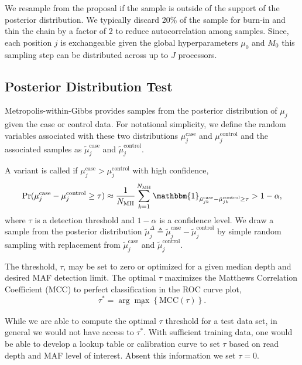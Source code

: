 \documentclass{bioinfo}
\begin{document}
We resample from the proposal if the sample is outside of the support of the posterior distribution. We typically discard 20\% of the sample for burn-in and thin the chain by a factor of 2 to reduce autocorrelation among samples. Since, each position $j$ is exchangeable given the global hyperparameters $\mu_0$ and $M_0$ this sampling step can be distributed across up to $J$ processors.

\subsection{Posterior Distribution Test}\label{sec:hypothesis_test}
Metropolis-within-Gibbs provides samples from the posterior distribution of $\mu_j$ given the case or control data. For notational simplicity, we define the random variables associated with these two distributions $\mu_j^{\text{case}}$ and $\mu_j^{\text{control}}$ and the associated samples as $\tilde{\mu}_j^{\text{case}}$ and $\tilde{\mu}_j^{\text{control}}$.

A variant is called if $\mu_j^{\text{case}} > \mu_j^{\text{control}}$ with high confidence,
\begin{equation}\label{eqn:bayes_test}
	\Pr( \mu_j^{\text{case}} - \mu_j^{\text{control}}  \geq \tau ) \approx \frac{1}{N_{\text{MH}}} \sum_{k=1}^{N_{\text{MH}}} \mathbbm{1}_{\tilde{\mu}_{jk}^{\text{case}} - \tilde{\mu}_{jk}^{\text{control}} \geq \tau } > 1-\alpha,
\end{equation}
where $\tau$ is a detection threshold and $1-\alpha$ is a confidence level. We draw a sample from the posterior distribution $\tilde{\mu}_j^{\Delta} \triangleq \tilde{\mu}_j^{\text{case}} - \tilde{\mu}_j^{\text{control}}$ by simple random sampling with replacement from $\tilde{\mu}_j^{\text{case}}$ and $\tilde{\mu}_j^{\text{control}}$.

The threshold, $\tau$, may be set to zero or optimized for a given median depth and desired MAF detection limit. The optimal $\tau$ maximizes the Matthews Correlation Coefficient (MCC) to perfect classification in the ROC curve plot,
\begin{equation}
	\tau^* = \arg\max_\tau \left\{ \text{MCC}(\tau)\right\}.
\end{equation}

While we are able to compute the optimal $\tau$ threshold for a test data set, in general we would not have access to $\tau^*$. With sufficient training data, one would be able to develop a lookup table or calibration curve to set $\tau$ based on read depth and MAF level of interest. Absent this information we set $\tau = 0$.
\end{document}

